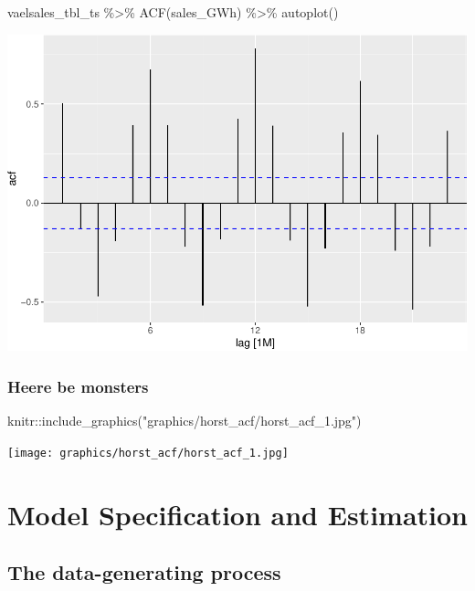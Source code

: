 \documentclass[
]{book}
\newenvironment{Shaded}{\begin{snugshade}}{\end{snugshade}}
\newcommand{\FunctionTok}[1]{\textcolor[rgb]{0.00,0.00,0.00}{#1}}
\newcommand{\NormalTok}[1]{#1}
\newcommand{\SpecialCharTok}[1]{\textcolor[rgb]{0.00,0.00,0.00}{#1}}
\newcommand{\StringTok}[1]{\textcolor[rgb]{0.31,0.60,0.02}{#1}}
\begin{document}
\begin{Shaded}
\begin{Highlighting}[]
\NormalTok{vaelsales\_tbl\_ts }\SpecialCharTok{\%\textgreater{}\%} \FunctionTok{ACF}\NormalTok{(sales\_GWh) }\SpecialCharTok{\%\textgreater{}\%} \FunctionTok{autoplot}\NormalTok{()}
\end{Highlighting}
\end{Shaded}

\includegraphics{graphics/unnamed-chunk-55-1.pdf}

\hypertarget{heere-be-monsters}{%
\section{Heere be monsters}\label{heere-be-monsters}}

\begin{Shaded}
\begin{Highlighting}[]
\NormalTok{knitr}\SpecialCharTok{::}\FunctionTok{include\_graphics}\NormalTok{(}\StringTok{"graphics/horst\_acf/horst\_acf\_1.jpg"}\NormalTok{)}
\end{Highlighting}
\end{Shaded}

\texttt{[image: graphics/horst\_acf/horst\_acf\_1.jpg]}

\hypertarget{part-model-specification-and-estimation}{%
\part{Model Specification and Estimation}\label{part-model-specification-and-estimation}}

\hypertarget{the-data-generating-process}{%
\chapter{The data-generating process}\label{the-data-generating-process}}
\end{document}
